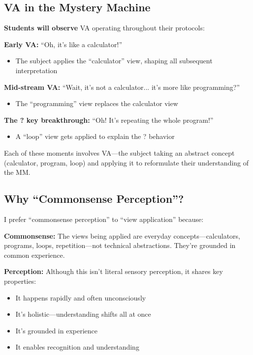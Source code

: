 \documentclass[12pt,letterpaper]{article}
\begin{document}
\subsection{VA in the Mystery Machine}

\textbf{Students will observe} VA operating throughout their protocols:

\textbf{Early VA:} ``Oh, it's like a calculator!''
\begin{itemize}
\item The subject applies the ``calculator'' view, shaping all subsequent interpretation
\end{itemize}

\textbf{Mid-stream VA:} ``Wait, it's not a calculator... it's more like programming?''
\begin{itemize}
\item The ``programming'' view replaces the calculator view
\end{itemize}

\textbf{The ? key breakthrough:} ``Oh! It's repeating the whole program!''
\begin{itemize}
\item A ``loop'' view gets applied to explain the ? behavior
\end{itemize}

Each of these moments involves VA—the subject taking an abstract concept (calculator, program, loop) and applying it to reformulate their understanding of the MM.

\subsection{Why ``Commonsense Perception''?}

I prefer ``commonsense perception'' to ``view application'' because:

\textbf{Commonsense:} The views being applied are everyday concepts—calculators, programs, loops, repetition—not technical abstractions. They're grounded in common experience.

\textbf{Perception:} Although this isn't literal sensory perception, it shares key properties:
\begin{itemize}
\item It happens rapidly and often unconsciously
\item It's holistic—understanding shifts all at once
\item It's grounded in experience
\item It enables recognition and understanding
\end{itemize}
\end{document}
